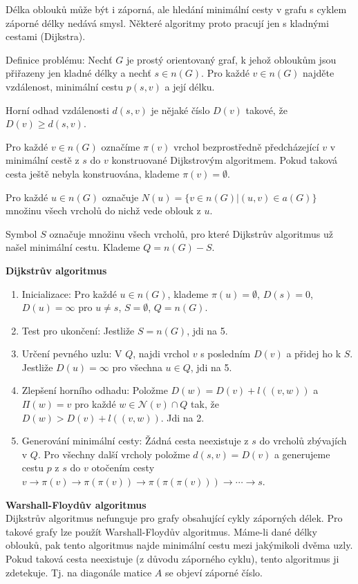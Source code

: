 Délka oblouků může být i záporná, ale hledání minimální cesty v grafu s cyklem záporné délky nedává smysl. Některé algoritmy proto pracují jen s kladnými cestami (Dijkstra).

Definice problému: Nechť $G$ je prostý orientovaný graf, k jehož obloukům jsou přiřazeny jen kladné délky a nechť $s \in n(G)$. Pro každé $v \in n(G)$ najděte vzdálenost, minimální cestu $p(s,v)$ a její délku.

Horní odhad vzdálenosti $d(s,v)$ je nějaké číslo $D(v)$ takové, že $D(v) \geq d(s,v)$. 

Pro každé $v \in n(G)$ označíme $\pi(v)$ vrchol bezprostředně předcházející $v$ v minimální cestě z $s$ do $v$ konstruované Dijkstrovým algoritmem. Pokud taková cesta ještě nebyla konstruována, klademe $\pi(v) = \emptyset$.

Pro každé $u \in n(G)$ označuje $N(u) = \{ v \in n(G) | (u,v) \in a(G) \}$ množinu všech vrcholů do nichž vede oblouk z $u$.

Symbol $S$ označuje množinu všech vrcholů, pro které Dijkstrův algoritmus už našel minimální cestu. Klademe $Q = n(G) - S$.

\textbf{Dijkstrův algoritmus}
\begin{enumerate}
    \item Inicializace: Pro každé $u\in n(G)$, klademe $\pi(u)=\emptyset$, $D(s)=0$, $D(u)=\infty$ pro $u\neq s$, $S=\emptyset$, $Q=n(G)$.
    \item Test pro ukončení: Jestliže $S=n(G)$, jdi na 5.
    \item Určení pevného uzlu: V $Q$, najdi vrchol $v$ s posledním $D(v)$ a přidej ho k $S$. Jestliže $D(u)=\infty$ pro všechna $u\in Q$, jdi na 5.
    \item Zlepšení horního odhadu: Položme $D(w)=D(v)+l((v,w))$ a
$\Pi(w)=v$ pro každé $w \in \mathcal{N} (v)  \cap Q$ tak, že $D(w)> D(v)+l((v,w))$. Jdi na 2.
    \item Generování minimální cesty: Žádná cesta neexistuje z $s$ do vrcholů zbývajích v $Q$. Pro všechny další vrcholy položme $d(s,v)=D(v)$ a generujeme cestu $p$ z $s$ do $v$ otočením cesty 
$v\rightarrow\pi(v)\rightarrow\pi(\pi(v))\rightarrow\pi(\pi(\pi(v)))\rightarrow\cdots\rightarrow s$.
\end{enumerate}


\textbf{Warshall-Floydův algoritmus}\\
Dijkstrův algoritmus nefunguje pro grafy obsahující cykly záporných délek. Pro takové grafy lze použít Warshall-Floydův algoritmus. Máme-li dané délky oblouků, pak tento algoritmus najde minimální cestu mezi jakýmikoli dvěma uzly. Pokud taková cesta neexistuje (z důvodu záporného cyklu), tento algoritmus ji zdetekuje. Tj. na diagonále matice $A$ se objeví záporné číslo.

